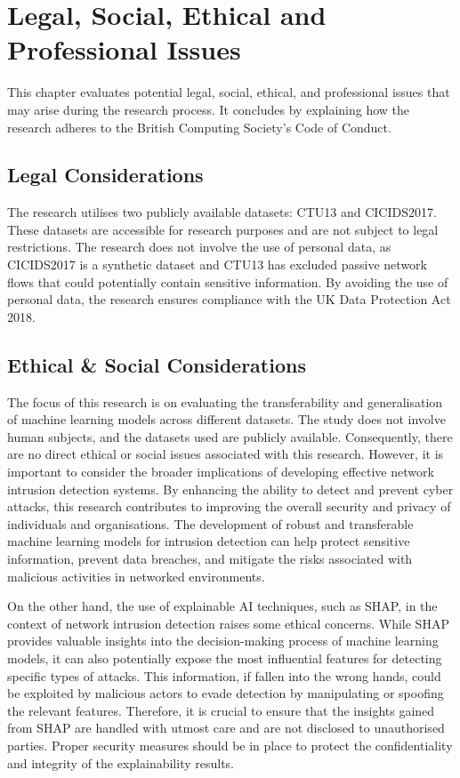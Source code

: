 \chapter{Legal, Social, Ethical and Professional Issues}
This chapter evaluates potential legal, social, ethical, and professional issues that may arise during the research process. It concludes by explaining how the research adheres to the British Computing Society's Code of Conduct.

\section{Legal Considerations}
The research utilises two publicly available datasets: CTU13\cite{garcia2014empirical} and CICIDS2017\cite{sharafaldin2018toward}. These datasets are accessible for research purposes and are not subject to legal restrictions. The research does not involve the use of personal data, as CICIDS2017 is a synthetic dataset and CTU13 has excluded passive network flows that could potentially contain sensitive information. By avoiding the use of personal data, the research ensures compliance with the UK Data Protection Act 2018.

\section{Ethical \& Social Considerations}
The focus of this research is on evaluating the transferability and generalisation of machine learning models across different datasets. The study does not involve human subjects, and the datasets used are publicly available. Consequently, there are no direct ethical or social issues associated with this research. However, it is important to consider the broader implications of developing effective network intrusion detection systems. By enhancing the ability to detect and prevent cyber attacks, this research contributes to improving the overall security and privacy of individuals and organisations. The development of robust and transferable machine learning models for intrusion detection can help protect sensitive information, prevent data breaches, and mitigate the risks associated with malicious activities in networked environments.

On the other hand, the use of explainable AI techniques, such as SHAP, in the context of network intrusion detection raises some ethical concerns. While SHAP provides valuable insights into the decision-making process of machine learning models, it can also potentially expose the most influential features for detecting specific types of attacks. This information, if fallen into the wrong hands, could be exploited by malicious actors to evade detection by manipulating or spoofing the relevant features. Therefore, it is crucial to ensure that the insights gained from SHAP are handled with utmost care and are not disclosed to unauthorised parties. Proper security measures should be in place to protect the confidentiality and integrity of the explainability results.

